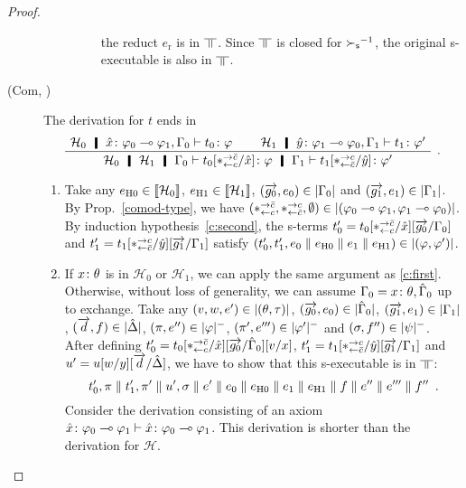 \begin{proof}
\begin{description}
\begin{enumerate}[label=\textit{(\arabic{*})}]
\begin{description}
                    the reduct $e_{\mathrm r}$ is in $\bbot$.
                    Since $\bbot$ is closed for ${\succ_{\mathsf s}}^{-1}$,
                    the original s-executable is also in $\bbot$.
              \end{description}
       \end{enumerate}
   \item[(Com, \textminus)]
	The derivation for $t$ ends in
	\[
	\aseq{\hyp{_0}\tj{\hat x}{\phi_0\limp\phi_1},\G_0}{\tj{t_0}{\phi}}
	\aseq{\hyp{_1}\tj{\hat y}{\phi_1\limp\phi_0},\G_1}{\tj{t_1}{\phi'}}
	\bseq{\hyp{_0}\hyp{_1}\G_0}{\tj{t_0[\comodL/\hat x]}{\phi}\hmid
	\G_1\tr \tj{t_1
	[\comodR/\hat y]}{\phi'}}
	\DisplayProof\enspace.
	\]
	\begin{enumerate}[label=\textit{(\arabic{*})}]
	\item Take any
	      $e_{\mathrm{H0}}\in\llbracket{\mathcal H_0}\rrbracket$,
	      $e_{\mathrm{H1}}\in\llbracket{\mathcal H_1}\rrbracket$,
	      $(\overrightarrow{g_0},{e_0})\in|{\Gamma_0}|$ and
	      $(\overrightarrow{g_1},{e_1})\in|{\Gamma_1}|$.
	      By Prop.~\ref{comod-type}, we have
	      $(\ast^{\rightarrow {\bar{c}}}_{\leftarrow{c}},\ast^{\rightarrow {c}}_{\leftarrow{\bar{c}}},\emptyset)\in|{(\varphi_0\multimap\varphi_1,\varphi_1\multimap\varphi_0)}|$.
	      By induction hypothesis~\ref{c:second}, the s-terms
	      $t'_0=t_0[\ast^{\rightarrow {\bar{c}}}_{\leftarrow{c}}/\hat{x}][\overrightarrow{g_0}/\Gamma_0]$ and
	      $t'_1=t_1[\ast^{\rightarrow {c}}_{\leftarrow{\bar{c}}}/\hat{y}][\overrightarrow{g_1}/\Gamma_1]$
	      satisfy
	      $(t_0',t_1',{e_0\parallel e_{\mathrm{H0}}}\parallel
	      {e_1\parallel e_{\mathrm{H1}}})\in|{(\varphi,\varphi')}|$.
	\item
	     If ${x} \colon{\theta}$ is in $\mathcal H_0$ or $\mathcal H_1$,
	     we can apply the same argument as \ref{c:first}.
	     Otherwise,
	      without loss of generality,
	      we can assume
	      $\Gamma_0 ={x} \colon{\theta}, {\hat{\Gamma}_0}$ up to exchange.
	      Take any
	      $(v,w,e')\in|{(\theta,\tau)}|$,
	     $(\overrightarrow{g_0},{e_0})\in|{\hat{\Gamma}_0}|$,
	     $(\overrightarrow{g_1},{e_1})\in|{\Gamma_1}|$,
	     $(\overrightarrow d, f)\in|{\hat{\Delta}}|$,
	     $(\pi,e'')\in|{\varphi}|^-$,
	     $(\pi',e''')\in|{\varphi'}|^-$
	     and
	     $(\sigma,f'')\in|{\psi}|^-$.
	     After defining $t_0' = t_0[\ast^{\rightarrow {\bar{c}}}_{\leftarrow{c}}/\hat
	     x][\overrightarrow{g_0}/\hat{\Gamma}_0][v/x]$,
	     $t'_1 = t_1[\ast^{\rightarrow {c}}_{\leftarrow{\bar{c}}}/\hat y][\overrightarrow{g_1}/\Gamma_1]$ and $u' =
	     u[w/y][\overrightarrow{d}/\hat{\Delta}]$,
	     we have to show that this s-executable is in $\bbot$:
	     \[
	      t'_0,\pi\parallel t'_1,\pi'\parallel u',\sigma\parallel e'\parallel
	     {e_0\parallel e_{\mathrm{H0}}}\parallel {e_1\parallel e_{\mathrm{H1}}}\parallel{f}\parallel e''\parallel
	     e'''\parallel f''\enspace.
	     \]
	     Consider the derivation consisting of an axiom
	     ${{\hat x} \colon{\varphi_0\multimap\varphi_1}}\vdash{ {\hat x} \colon{\varphi_0\multimap\varphi_1} }$.
	     This derivation is shorter than the derivation for
	     $\mathcal H$.

\end{enumerate}
\end{description}
\end{proof}
